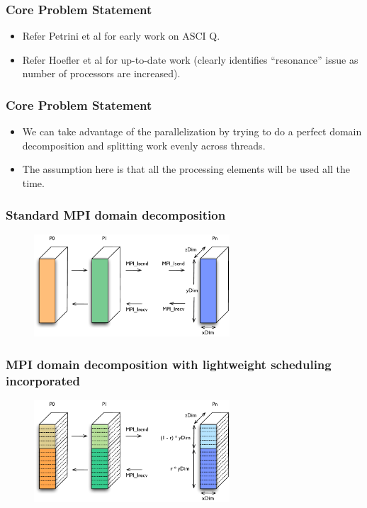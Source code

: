 \begin{frame}
\frametitle{Core Problem Statement}
\begin{itemize}
\item Refer Petrini et al for early work on ASCI Q.
\item Refer Hoefler  et al for up-to-date work  (clearly identifies ``resonance'' issue as number of processors are increased). 
\end{itemize}
\end{frame}

\begin{frame}
\frametitle{Core Problem Statement}
\begin{itemize}
\item We can take advantage of the parallelization by trying to do a
  perfect domain decomposition and splitting work evenly across
  threads. 
\item The assumption here is that all the processing elements will be used all the time. 
\end{itemize}
\end{frame}

\begin{frame}
\frametitle{Standard MPI domain decomposition}
  \begin{figure}
    \includegraphics[width=0.65\textwidth]{images/mpi_decomp}
  \end{figure}
\end{frame}

\begin{frame}
\frametitle{MPI domain decomposition with lightweight scheduling incorporated}
  \begin{figure}
    \includegraphics[width=0.65\textwidth]{images/hybrid_decomp}
\end{figure}
\end{frame}

